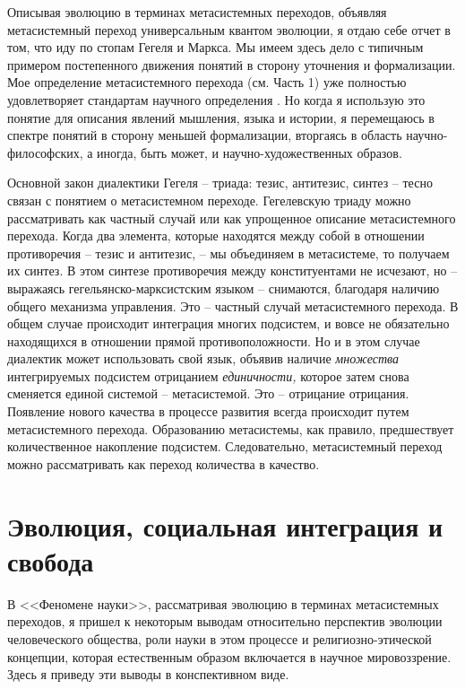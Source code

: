 \documentclass{book}
\begin{document}
Описывая эволюцию в терминах метасистемных переходов, объявляя метасистемный переход универсальным квантом эволюции, я отдаю себе отчет в том, что иду по стопам Гегеля и Маркса. Мы имеем здесь дело с типичным примером постепен­ного движения понятий в сторону уточнения и формализации. Мое определение метасистемного перехода (см. Часть 1) уже полностью удовлетворяет стандартам научного определения%
.
Но когда я использую это понятие для описания явлений мыш­ления, языка и истории, я перемещаюсь в спектре понятий в сторону меньшей формализации, вторгаясь в область научно-философских, а иногда, быть может, и научно-художественных образов.

Основной закон диалектики Гегеля -- триада: тезис, антитезис, синтез -- тесно связан с понятием о метасистемном переходе. Гегелевскую триаду можно рассматривать как частный случай или как упрощенное описание метасистемного перехода. Когда два элемента, которые находятся между собой в отношении противоречия -- тезис и антитезис, -- мы объединяем в метасистеме, то получаем их синтез. В этом синтезе противоречия между конституентами не исчезают, но -- выражаясь гегельянско-марксистским языком -- снимаются, благодаря наличию общего механизма управления. Это -- частный случай метасистемного перехода. В общем случае происходит интег­рация многих подсистем, и вовсе не обязательно находящихся в отношении прямой противоположности. Но и в этом случае диалектик может использовать свой язык, объявив наличие \textit{множества}  интегрируемых подсистем отрицанием \textit{единичности,} которое затем снова сменяется единой системой -- метасистемой. Это -- отрицание отрицания. Появление нового качества в процессе развития 
всегда происходит 
путем метасистемного перехода. Образованию метасистемы, как правило, предшествует количественное накопление подсистем. Следовательно, метасистемный переход можно рассматривать как переход количества в качество.


\section{Эволюция, социальная интеграция и свобода}

В <<Феномене науки>>, рассматривая эволюцию в терминах метасистемных переходов, я пришел к некоторым выводам относительно перспектив эволюции человеческого общества, роли науки в этом процессе и религиозно-этической концепции, которая естественным образом включается в научное ми­ровоззрение. Здесь я приведу эти выводы в конспективном виде.
\end{document}
